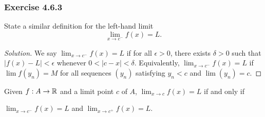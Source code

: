 \subsubsection{Exercise 4.6.3} State a similar definition for the left-hand limit
\[  \lim_{ x \to c^{-} } f(x) = L. \]
\begin{proof}[Solution]
    We say \( \lim_{ x \to c^{-}  } f(x) = L  \) if for all \( \epsilon > 0  \), there exists \( \delta > 0  \) such that \( | f(x) - L  | < \epsilon  \) whenever \( 0 < | c - x  | < \delta  \). Equivalently, \( \lim_{ x \to c^{-} } f(x) = L  \) if \( \lim f(y_n) = M  \) for all sequences \( (y_n)  \) satisfying \( y_n < c  \) and \( \lim (y_n) = c  \).
\end{proof}

\begin{theorem}
Given \( f: A \to \mathbb{R}  \) and a limit point \( c  \) of \( A  \), \( \lim_{ x \to c  } f(x) = L  \) if and only if 
\begin{center}
    \( \lim_{ x \to c^{-} } f(x) = L  \) and \( \lim_{ x \to c^{+} } f(x) = L  \).
\end{center}
\end{theorem}

